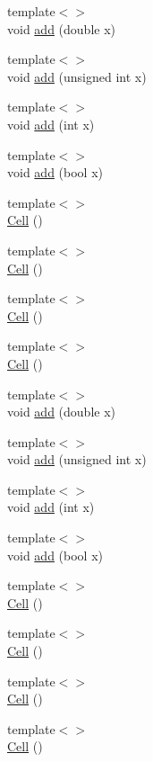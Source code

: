\begin{DoxyCompactItemize}
{\footnotesize template$<$$>$ }\\void \hyperlink{class_cell_a64d4b92f322ccb8cfbad53f816d2caf8}{add} (double x)
\item 
{\footnotesize template$<$$>$ }\\void \hyperlink{class_cell_ae22060201cf692bbf219827453d0acd2}{add} (unsigned int x)
\item 
{\footnotesize template$<$$>$ }\\void \hyperlink{class_cell_a74cb069c7341de33354c396465818c2f}{add} (int x)
\item 
{\footnotesize template$<$$>$ }\\void \hyperlink{class_cell_a0da6d3d39069cc22486442cc51c7685c}{add} (bool x)
\item 
{\footnotesize template$<$$>$ }\\\hyperlink{class_cell_a5ecdaddaf4661a9a8fe6f0ed61595847}{Cell} ()
\item 
{\footnotesize template$<$$>$ }\\\hyperlink{class_cell_aa102374546b7479f50a8eeec80ec2764}{Cell} ()
\item 
{\footnotesize template$<$$>$ }\\\hyperlink{class_cell_a7019dc2ccc1e14bd17aa9f03b377a199}{Cell} ()
\item 
{\footnotesize template$<$$>$ }\\\hyperlink{class_cell_aef4b64101b33e2349ceea132b962d137}{Cell} ()
\item 
{\footnotesize template$<$$>$ }\\void \hyperlink{class_cell_a64d4b92f322ccb8cfbad53f816d2caf8}{add} (double x)
\item 
{\footnotesize template$<$$>$ }\\void \hyperlink{class_cell_ae22060201cf692bbf219827453d0acd2}{add} (unsigned int x)
\item 
{\footnotesize template$<$$>$ }\\void \hyperlink{class_cell_a74cb069c7341de33354c396465818c2f}{add} (int x)
\item 
{\footnotesize template$<$$>$ }\\void \hyperlink{class_cell_a0da6d3d39069cc22486442cc51c7685c}{add} (bool x)
\item 
{\footnotesize template$<$$>$ }\\\hyperlink{class_cell_a5ecdaddaf4661a9a8fe6f0ed61595847}{Cell} ()
\item 
{\footnotesize template$<$$>$ }\\\hyperlink{class_cell_aa102374546b7479f50a8eeec80ec2764}{Cell} ()
\item 
{\footnotesize template$<$$>$ }\\\hyperlink{class_cell_a7019dc2ccc1e14bd17aa9f03b377a199}{Cell} ()
\item 
{\footnotesize template$<$$>$ }\\\hyperlink{class_cell_aef4b64101b33e2349ceea132b962d137}{Cell} ()
\end{DoxyCompactItemize}
